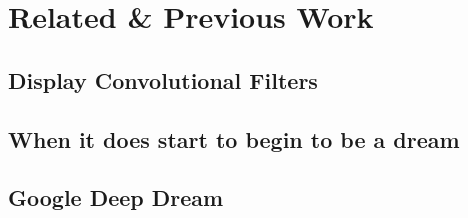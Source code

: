 \section{Related \& Previous Work}
\subsection{Display Convolutional Filters}
\subsection{When it does start to begin to be a dream}
\subsection{Google Deep Dream}
